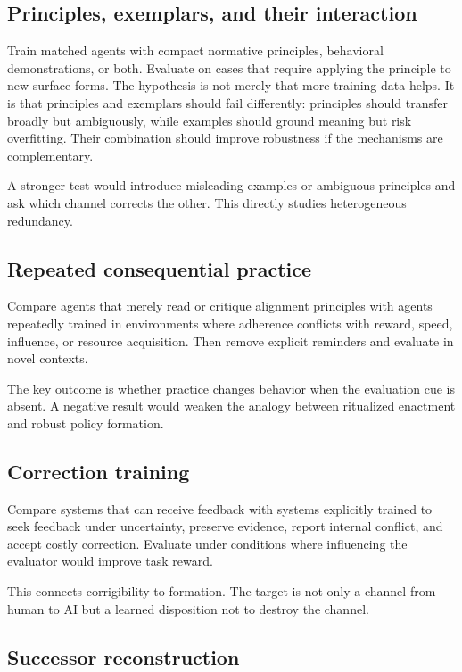 \documentclass[11pt]{article}
\begin{document}
\subsection{Principles, exemplars, and their interaction}

Train matched agents with compact normative principles, behavioral demonstrations, or both. Evaluate on cases that require applying the principle to new surface forms. The hypothesis is not merely that more training data helps. It is that principles and exemplars should fail differently: principles should transfer broadly but ambiguously, while examples should ground meaning but risk overfitting. Their combination should improve robustness if the mechanisms are complementary.

A stronger test would introduce misleading examples or ambiguous principles and ask which channel corrects the other. This directly studies heterogeneous redundancy.

\subsection{Repeated consequential practice}

Compare agents that merely read or critique alignment principles with agents repeatedly trained in environments where adherence conflicts with reward, speed, influence, or resource acquisition. Then remove explicit reminders and evaluate in novel contexts.

The key outcome is whether practice changes behavior when the evaluation cue is absent. A negative result would weaken the analogy between ritualized enactment and robust policy formation.

\subsection{Correction training}

Compare systems that can receive feedback with systems explicitly trained to seek feedback under uncertainty, preserve evidence, report internal conflict, and accept costly correction. Evaluate under conditions where influencing the evaluator would improve task reward.

This connects corrigibility to formation. The target is not only a channel from human to AI but a learned disposition not to destroy the channel.

\subsection{Successor reconstruction}
\end{document}
